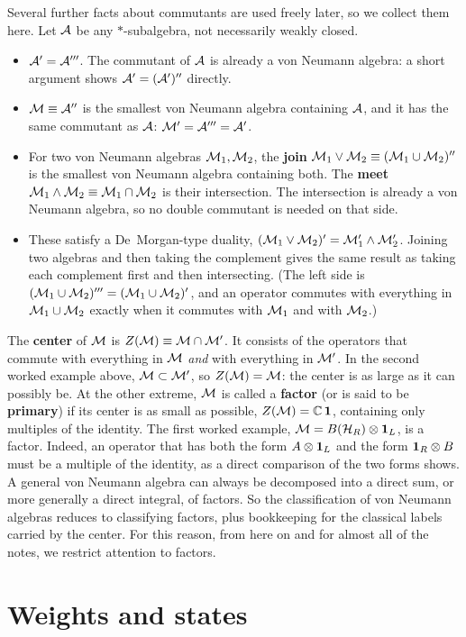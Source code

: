 Several further facts about commutants are used freely later, so we collect them here. Let $\mathcal{A}$ be any
$*$-subalgebra, not necessarily weakly closed.
\begin{itemize}
\item $\mathcal{A}'=\mathcal{A}'''$. The commutant of $\mathcal{A}$ is already a von Neumann algebra: a short argument shows
$\mathcal{A}'=(\mathcal{A}')''$ directly.
\item $\mathcal{M}\equiv\mathcal{A}''$ is the smallest von Neumann algebra containing $\mathcal{A}$, and it has the same commutant
as $\mathcal{A}$: $\mathcal{M}'=\mathcal{A}'''=\mathcal{A}'$.
\item For two von Neumann algebras $\mathcal{M}_1,\mathcal{M}_2$, the \textbf{join} $\mathcal{M}_1\vee\mathcal{M}_2\equiv(\mathcal{M}_1\cup\mathcal{M}_2)''$ is the
smallest von Neumann algebra containing both. The \textbf{meet} $\mathcal{M}_1\wedge\mathcal{M}_2\equiv\mathcal{M}_1\cap\mathcal{M}_2$ is their
intersection. The intersection is already a von Neumann algebra, so no double commutant is needed on that
side.
\item These satisfy a De~Morgan-type duality, $(\mathcal{M}_1\vee\mathcal{M}_2)'=\mathcal{M}_1'\wedge\mathcal{M}_2'$. Joining two algebras and
then taking the complement gives the same result as taking each complement first and then intersecting. (The
left side is $(\mathcal{M}_1\cup\mathcal{M}_2)'''=(\mathcal{M}_1\cup\mathcal{M}_2)'$, and an operator commutes with everything in
$\mathcal{M}_1\cup\mathcal{M}_2$ exactly when it commutes with $\mathcal{M}_1$ and with $\mathcal{M}_2$.)
\end{itemize}

The \textbf{center} of $\mathcal{M}$ is $Z(\mathcal{M})\equiv\mathcal{M}\cap\mathcal{M}'$. It consists of the operators that commute with
everything in $\mathcal{M}$ \emph{and} with everything in $\mathcal{M}'$. In the second worked example above, $\mathcal{M}\subset\mathcal{M}'$,
so $Z(\mathcal{M})=\mathcal{M}$: the center is as large as it can possibly be. At the other extreme, $\mathcal{M}$ is called a
\textbf{factor} (or is said to be \textbf{primary}) if its center is as small as possible,
$Z(\mathcal{M})=\mathbb C\,\mathbf{1}$, containing only multiples of the identity. The first worked example,
$\mathcal{M}=B(\mathcal{H}_R)\otimes\mathbf{1}_L$, is a factor. Indeed, an operator that has both the form $A\otimes\mathbf{1}_L$ and the
form $\mathbf{1}_R\otimes B$ must be a multiple of the identity, as a direct comparison of the two forms shows. A
general von Neumann algebra can always be decomposed into a direct sum, or more generally a direct integral,
of factors. So the classification of von Neumann algebras reduces to classifying factors, plus bookkeeping
for the classical labels carried by the center. For this reason, from here on and for almost all of the
notes, we restrict attention to factors.

\section{Weights and states}

